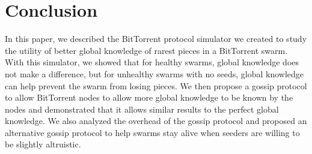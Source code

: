 \section{Conclusion}

In this paper, we described the BitTorrent protocol simulator we created
to study the utility of better global knowledge of rarest pieces in a
BitTorrent swarm. With this simulator, we showed that for healthy swarms,
global knowledge does not make a difference, but for unhealthy swarms
with no seeds, global knowledge can help prevent the swarm from losing
pieces.  We then propose a gossip protocol to allow BitTorrent nodes to
allow more global knowledge to be known by the nodes and demonstrated
that it allows similar results to the perfect global knowledge. We also
analyzed the overhead of the gossip protocol and proposed an alternative
gossip protocol to help swarms stay alive when seeders are willing to
be slightly altruistic.
